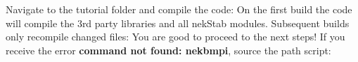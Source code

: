 {}
\markdownRendererSectionEnd 
\markdownRendererSectionEnd \markdownRendererSectionBegin
{}\markdownRendererInterblockSeparator
{}Navigate to the tutorial folder and compile the code:\markdownRendererInterblockSeparator
{}\markdownRendererInterblockSeparator
{}On the first build the code will compile the 3rd party libraries and all nekStab modules. Subsequent builds only recompile changed files:\markdownRendererInterblockSeparator
{}\markdownRendererInterblockSeparator
{}You are good to proceed to the next steps!\markdownRendererInterblockSeparator
{}\markdownRendererSectionBegin
{}\markdownRendererInterblockSeparator
{}If you receive the error \textbf{command not found: nekbmpi}, source the path script:\markdownRendererInterblockSeparator
{}
\markdownRendererSectionEnd 
\markdownRendererSectionEnd \markdownRendererDocumentEnd